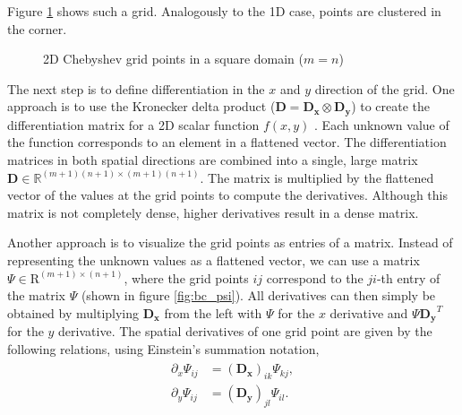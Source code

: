 Figure \ref{fig:cheb_grid2d} shows such a grid. Analogously to the 1D case,
points are clustered in the corner. \\

\begin{figure}[ht]
  \centering
  \caption{2D Chebyshev grid points in a square domain ($m = n$)}
  \label{fig:cheb_grid2d}
\end{figure}

The next step is to define differentiation in the $x$ and $y$ direction of the
grid. One approach is to use the Kronecker delta product ($\mathbf{D} =
\mathbf{D_x} \otimes \mathbf{D_y}$) to create the differentiation matrix for a
2D scalar function $f(x,y)$ \citep{trefethen2000}. Each unknown value of the
function corresponds to an element in a flattened vector. The differentiation
matrices in both spatial directions are combined into a single, large matrix
$\mathbf{D} \in \mathbb{R}^{(m+1)(n+1)\times(m+1)(n+1)}$. The matrix is
multiplied by the flattened vector of the values at the grid points to compute
the derivatives. Although this matrix is not completely dense, higher
derivatives result in a dense matrix.

Another approach is to visualize the grid points as entries of a matrix.
Instead of representing the unknown values as a flattened vector, we can use a
matrix $\Psi \in \mathrm{R}^{(m+1) \times (n+1)}$, where the grid points $ij$
correspond to the $ji$-th entry of the matrix $\Psi$ (shown in figure
\ref{fig:bc_psi}). All derivatives can then simply be obtained by multiplying
$\mathbf{D_x}$ from the left with $\Psi$ for the $x$ derivative and $\Psi
\mathbf{D_y}^T$ for the $y$ derivative. The spatial derivatives of one grid
point are given by the following relations, using Einstein's summation
notation,
\begin{align}
  \begin{split}
  \partial_x \Psi_{ij} &= (\mathbf{D_x})_{ik} \Psi_{kj}, \\
  \partial_y \Psi_{ij} &= (\mathbf{D_y})_{jl} \Psi_{il}.
  \end{split}
\label{eq:discr_der}
\end{align}

